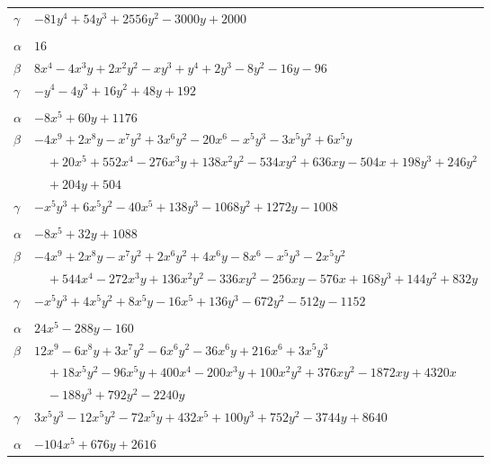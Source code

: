 \documentclass[11pt]{article}
\begin{document}
\begin{longtable}{@{}ll@{}}
$\gamma$ & $-81y^{4}+54y^{3}+2556y^{2}-3000y+2000$\\
\addlinespace[3pt]
\multicolumn{2}{@{}l}{$\{i,j\}=\{5,15\}$, $k_{ij}=2^{6}\cdot 7$}\\
$\alpha$ & $16$\\
$\beta$ & $8x^{4}-4x^{3}y+2x^{2}y^{2}-xy^{3}+y^{4}+2y^{3}-8y^{2}-16y-96$\\
$\gamma$ & $-y^{4}-4y^{3}+16y^{2}+48y+192$\\
\addlinespace[3pt]
\multicolumn{2}{@{}l}{$\{i,j\}=\{5,26\}$, $k_{ij}=2^{4}\cdot 3\cdot 7\cdot 11$}\\
$\alpha$ & $-8x^{5}+60y+1176$\\
$\beta$ & $-4x^{9}+2x^{8}y-x^{7}y^{2}+3x^{6}y^{2}-20x^{6}-x^{5}y^{3}-3x^{5}y^{2}+6x^{5}y$\\
 & $\quad +20x^{5}+552x^{4}-276x^{3}y+138x^{2}y^{2}-534xy^{2}+636xy-504x+198y^{3}+246y^{2}$\\
 & $\quad +204y+504$\\
$\gamma$ & $-x^{5}y^{3}+6x^{5}y^{2}-40x^{5}+138y^{3}-1068y^{2}+1272y-1008$\\
\addlinespace[3pt]
\multicolumn{2}{@{}l}{$\{i,j\}=\{5,27\}$, $k_{ij}=2^{9}\cdot 13$}\\
$\alpha$ & $-8x^{5}+32y+1088$\\
$\beta$ & $-4x^{9}+2x^{8}y-x^{7}y^{2}+2x^{6}y^{2}+4x^{6}y-8x^{6}-x^{5}y^{3}-2x^{5}y^{2}$\\
 & $\quad +544x^{4}-272x^{3}y+136x^{2}y^{2}-336xy^{2}-256xy-576x+168y^{3}+144y^{2}+832y$\\
$\gamma$ & $-x^{5}y^{3}+4x^{5}y^{2}+8x^{5}y-16x^{5}+136y^{3}-672y^{2}-512y-1152$\\
\addlinespace[3pt]
\multicolumn{2}{@{}l}{$\{i,j\}=\{5,28\}$, $k_{ij}=2^{8}\cdot 5\cdot 13$}\\
$\alpha$ & $24x^{5}-288y-160$\\
$\beta$ & $12x^{9}-6x^{8}y+3x^{7}y^{2}-6x^{6}y^{2}-36x^{6}y+216x^{6}+3x^{5}y^{3}$\\
 & $\quad +18x^{5}y^{2}-96x^{5}y+400x^{4}-200x^{3}y+100x^{2}y^{2}+376xy^{2}-1872xy+4320x$\\
 & $\quad -188y^{3}+792y^{2}-2240y$\\
$\gamma$ & $3x^{5}y^{3}-12x^{5}y^{2}-72x^{5}y+432x^{5}+100y^{3}+752y^{2}-3744y+8640$\\
\addlinespace[3pt]
\multicolumn{2}{@{}l}{$\{i,j\}=\{5,29\}$, $k_{ij}=2^{4}\cdot 3^{2}\cdot 11^{2}$}\\
$\alpha$ & $-104x^{5}+676y+2616$\\

\end{longtable}
\end{document}
